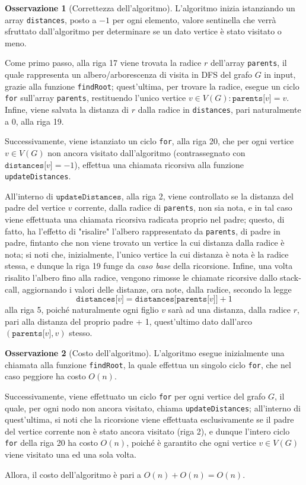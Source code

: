 \documentclass[14pt]{extreport}
\theoremstyle{definition}
\theoremstyle{definition}
\newtheorem{remark}{Osservazione}[subsection]
\begin{document}
\begin{remark}[Correttezza dell'algoritmo]
    L'algoritmo inizia istanziando un array \texttt{distances}, posto a $-1$ per ogni elemento, valore sentinella che verrà sfruttato dall'algoritmo per determinare se un dato vertice è stato visitato o meno.

    Come primo passo, alla riga 17 viene trovata la radice $r$ dell'array \texttt{parents}, il quale rappresenta un albero/arborescenza di visita in DFS del grafo $G$ in input, grazie alla funzione \texttt{findRoot}; quest'ultima, per trovare la radice, esegue un ciclo \texttt{for} sull'array \texttt{parents}, restituendo l'unico vertice $v \in V(G) : \texttt{parents[}v\texttt{]} = v$. Infine, viene salvata la distanza di $r$ dalla radice in \texttt{distances}, pari naturalmente a 0, alla riga 19.

    Successivamente, viene istanziato un ciclo \texttt{for}, alla riga 20, che per ogni vertice $v \in V(G)$ non ancora visitato dall'algoritmo (contrassegnato con $\texttt{distances[}v\texttt{]} = -1$), effettua una chiamata ricorsiva alla funzione \texttt{updateDistances}.

    All'interno di $\texttt{updateDistances}$, alla riga 2, viene controllato se la distanza del padre del vertice $v$ corrente, dalla radice di \texttt{parents}, non sia nota, e in tal caso viene effettuata una chiamata ricorsiva radicata proprio nel padre; questo, di fatto, ha l'effetto di "risalire" l'albero rappresentato da \texttt{parents}, di padre in padre, fintanto che non viene trovato un vertice la cui distanza dalla radice è nota; si noti che, inizialmente, l'unico vertice la cui distanza è nota è la radice stessa, e dunque la riga 19 funge da \textit{caso base} della ricorsione. Infine, una volta risalito l'albero fino alla radice, vengono rimosse le chiamate ricorsive dallo stack-call, aggiornando i valori delle distanze, ora note, dalla radice, secondo la legge $$\texttt{distances[}v\texttt{]} = \texttt{distances[parents[}v\texttt{]]} + 1$$ alla riga 5, poiché naturalmente ogni figlio $v$ sarà ad una distanza, dalla radice $r$, pari alla distanza del proprio padre + 1, quest'ultimo dato dall'arco $(\texttt{parents[}v\texttt{]}, v)$ stesso.
\end{remark}

\begin{remark}[Costo dell'algoritmo]
    L'algoritmo esegue inizialmente una chiamata alla funzione \texttt{findRoot}, la quale effettua un singolo ciclo \texttt{for}, che nel caso peggiore ha costo $O(n)$.

    Successivamente, viene effettuato un ciclo \texttt{for} per ogni vertice del grafo $G$, il quale, per ogni nodo non ancora visitato, chiama \texttt{updateDistances}; all'interno di quest'ultima, si noti che la ricorsione viene effettuata esclusivamente se il padre del vertice corrente non è stato ancora visitato (riga 2), e dunque l'intero ciclo \texttt{for} della riga 20 ha costo $O(n)$, poiché è garantito che ogni vertice $v \in V(G)$ viene visitato una ed una sola volta.

    Allora, il costo dell'algoritmo è pari a $O(n) + O(n) = O(n)$.
\end{remark}
\end{document}
